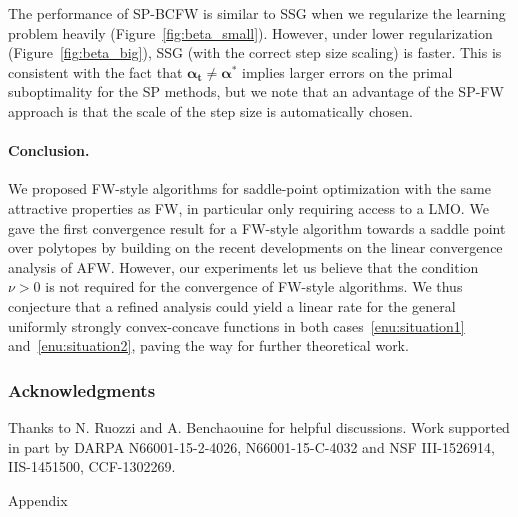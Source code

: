 \documentclass[twoside]{article}
\newcommand{\CondNumb}{\nu}
\newcommand{\0}{\mathbf{0}} %
\begin{document}
The performance of SP-BCFW is similar to SSG when we regularize the learning problem heavily (Figure~\ref{fig:beta_small}). 
However, under lower regularization (Figure~\ref{fig:beta_big}), SSG (with the correct step size scaling) is faster. This is consistent with the fact that $\bm{\alpha_t} \neq \bm{\alpha}^*$ implies larger errors on the primal suboptimality for the SP methods, but we note that an advantage of the SP-FW approach is that the scale of the step size is automatically chosen.

%
%
%

\paragraph{Conclusion.}\label{sec:conclusion} 
We proposed FW-style algorithms for saddle-point optimization with the same attractive properties as FW, in particular only requiring access to a LMO. We gave the first convergence result for a FW-style algorithm towards a saddle point over polytopes by building on the recent developments on the linear convergence analysis of AFW.
However, our experiments let us believe that the condition $\CondNumb > 0$ is not required for the convergence of FW-style algorithms.
We thus conjecture that a refined analysis could yield a linear rate for the general uniformly strongly convex-concave functions in both cases~\eqref{enu:situation1} and~\eqref{enu:situation2}, paving the way for further theoretical work.

\clearpage
%
\subsubsection*{Acknowledgments} %
\label{par:acknowledgments} 
Thanks to N. Ruozzi and
A. Benchaouine for helpful discussions. Work supported in
part by DARPA N66001-15-2-4026, N66001-15-C-4032 and NSF
III-1526914, IIS-1451500, CCF-1302269.
%
%
%
%
   
  {
  
  }

  \clearpage



  \appendix
  \onecolumn
  \fontsize{11}{13}
  \selectfont

%
  {\huge  Appendix}
\end{document}
